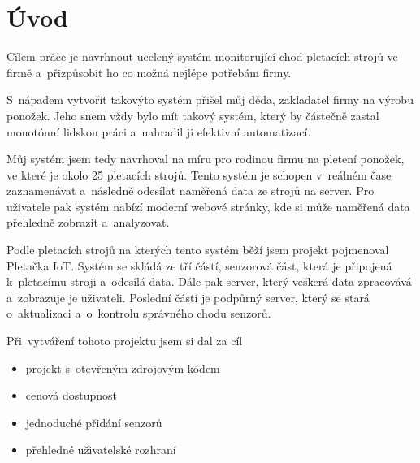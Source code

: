 \chapter*{Úvod}

Cílem práce je navrhnout ucelený systém monitorující chod pletacích strojů ve firmě a~přizpůsobit ho co možná nejlépe potřebám firmy.

S~nápadem vytvořit takovýto systém přišel můj děda, zakladatel firmy na výrobu ponožek.
Jeho snem vždy bylo mít takový systém, který by částečně zastal monotónní lidskou práci a~nahradil ji efektivní automatizací.

Můj systém jsem tedy navrhoval na míru pro rodinou firmu na pletení ponožek, ve které je okolo 25 pletacích strojů. 
Tento systém je schopen v~reálném čase zaznamenávat a~následně odesílat naměřená data ze strojů na server. 
Pro uživatele pak systém nabízí moderní webové stránky, kde si může naměřená data přehledně zobrazit a~analyzovat.

Podle pletacích strojů na kterých tento systém běží jsem projekt pojmenoval Pletačka IoT. 
Systém se skládá ze tří částí, senzorová část, která je připojená k~pletacímu stroji a~odesílá data.
Dále pak server, který veškerá data zpracovává a~zobrazuje je uživateli.
Poslední částí je podpůrný server, který se stará o~aktualizaci a~o~kontrolu správného chodu senzorů.\newline



Při~vytváření tohoto projektu jsem si dal za cíl
\begin{itemize}
    \item projekt s~otevřeným zdrojovým kódem
    \item cenová dostupnost
    \item jednoduché přidání senzorů
    \item přehledné uživatelské rozhraní
\end{itemize}

\newpage
